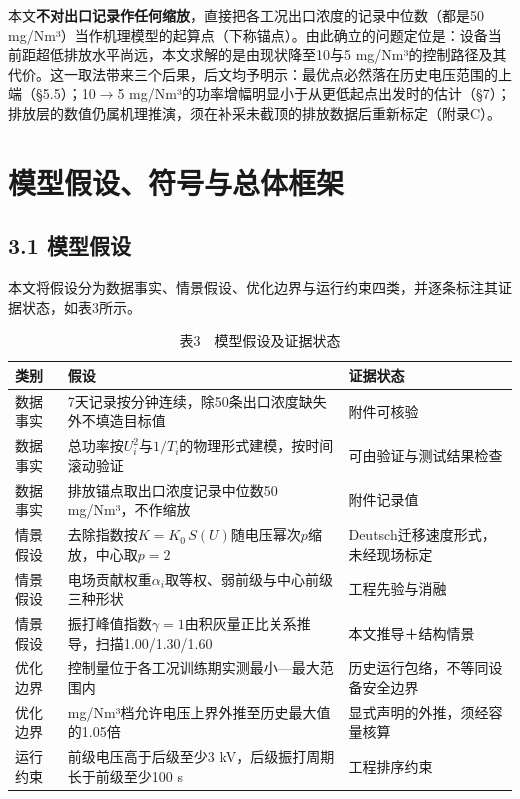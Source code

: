 \documentclass[UTF8,zihao=5,a4paper]{ctexart}
\begin{document}
本文\textbf{不对出口记录作任何缩放}，直接把各工况出口浓度的记录中位数（都是50 mg/Nm³）当作机理模型的起算点（下称锚点）。由此确立的问题定位是：设备当前距超低排放水平尚远，本文求解的是由现状降至10与5 mg/Nm³的控制路径及其代价。这一取法带来三个后果，后文均予明示：最优点必然落在历史电压范围的上端（§5.5）；10$\rightarrow$5 mg/Nm³的功率增幅明显小于从更低起点出发时的估计（§7）；排放层的数值仍属机理推演，须在补采未截顶的排放数据后重新标定（附录C）。

\section{模型假设、符号与总体框架}

\subsection*{3.1 模型假设}

本文将假设分为数据事实、情景假设、优化边界与运行约束四类，并逐条标注其证据状态，如表3所示。


\begin{table}[htb]
\centering
\caption*{\normalsize 表3　模型假设及证据状态}
\vspace{-2pt}
\begin{tabularx}{\textwidth}{l>{\hsize=1.127\hsize\raggedright\arraybackslash}X>{\hsize=0.873\hsize\raggedright\arraybackslash}X}
\toprule
类别 & 假设 & 证据状态 \\
\midrule
数据事实 & 7天记录按分钟连续，除50条出口浓度缺失外不填造目标值 & 附件可核验 \\
数据事实 & 总功率按$U_i^2$与$1/T_i$的物理形式建模，按时间滚动验证 & 可由验证与测试结果检查 \\
数据事实 & 排放锚点取出口浓度记录中位数50 mg/Nm³，不作缩放 & 附件记录值 \\
情景假设 & 去除指数按$K=K_0\,S(U)$随电压幂次$p$缩放，中心取$p=2$ & Deutsch迁移速度形式，未经现场标定 \\
情景假设 & 电场贡献权重$\alpha_i$取等权、弱前级与中心前级三种形状 & 工程先验与消融 \\
情景假设 & 振打峰值指数$\gamma=1$由积灰量正比关系推导，扫描1.00/1.30/1.60 & 本文推导＋结构情景 \\
优化边界 & 控制量位于各工况训练期实测最小—最大范围内 & 历史运行包络，不等同设备安全边界 \\
优化边界 & 5 mg/Nm³档允许电压上界外推至历史最大值的1.05倍 & 显式声明的外推，须经容量核算 \\
运行约束 & 前级电压高于后级至少3 kV，后级振打周期长于前级至少100 s & 工程排序约束 \\
\bottomrule
\end{tabularx}
\end{table}
\end{document}
